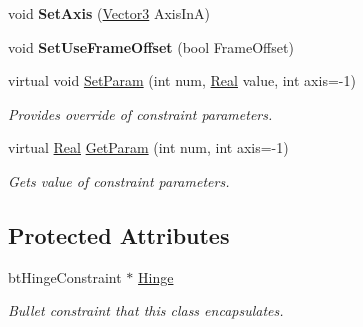 \begin{DoxyCompactItemize}
\item 
\hypertarget{classphys_1_1HingeConstraint_a25b0004ae13f202cff82f7aaa3722d98}{
void {\bfseries SetAxis} (\hyperlink{classphys_1_1Vector3}{Vector3} AxisInA)}
\label{d3/d0d/classphys_1_1HingeConstraint_a25b0004ae13f202cff82f7aaa3722d98}

\item 
\hypertarget{classphys_1_1HingeConstraint_a06a8ac244cefe64c2ce865e608cb2f41}{
void {\bfseries SetUseFrameOffset} (bool FrameOffset)}
\label{d3/d0d/classphys_1_1HingeConstraint_a06a8ac244cefe64c2ce865e608cb2f41}

\item 
virtual void \hyperlink{classphys_1_1HingeConstraint_adec79d062d67532e3521eaae6b49f877}{SetParam} (int num, \hyperlink{namespacephys_af7eb897198d265b8e868f45240230d5f}{Real} value, int axis=-\/1)
\begin{DoxyCompactList}\small\item\em Provides override of constraint parameters. \item\end{DoxyCompactList}\item 
virtual \hyperlink{namespacephys_af7eb897198d265b8e868f45240230d5f}{Real} \hyperlink{classphys_1_1HingeConstraint_a7e8c001ee6291bf457c9860124cacaf8}{GetParam} (int num, int axis=-\/1)
\begin{DoxyCompactList}\small\item\em Gets value of constraint parameters. \item\end{DoxyCompactList}\end{DoxyCompactItemize}
\subsection*{Protected Attributes}
\begin{DoxyCompactItemize}
\item 
\hypertarget{classphys_1_1HingeConstraint_afa4e4f1595d6420f21449d5e3b730f49}{
btHingeConstraint $\ast$ \hyperlink{classphys_1_1HingeConstraint_afa4e4f1595d6420f21449d5e3b730f49}{Hinge}}
\label{d3/d0d/classphys_1_1HingeConstraint_afa4e4f1595d6420f21449d5e3b730f49}

\begin{DoxyCompactList}\small\item\em Bullet constraint that this class encapsulates. \item\end{DoxyCompactList}\end{DoxyCompactItemize}


